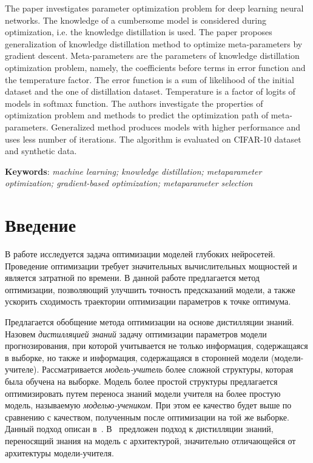 \documentclass[12pt, twoside]{article}
\begin{document}
\abstractEng
{The paper investigates parameter optimization problem for deep learning neural networks. The knowledge of a cumbersome model is considered during optimization, i.e. the knowledge distillation is used. The paper proposes generalization of knowledge distillation method to optimize meta-parameters by gradient descent. Meta-parameters are the parameters of knowledge distillation optimization problem, namely, the coefficients before terms in error function and the temperature factor. The error function is a sum of likelihood of the initial dataset and the one of distillation dataset. Temperature is a factor of logits of models in softmax function. The authors investigate the properties of optimization problem and methods to predict the optimization path of meta-parameters. Generalized method produces models with higher performance and uses less number of iterations. The algorithm is evaluated on CIFAR-10 dataset and synthetic data.


\noindent
\textbf{Keywords}: \emph{machine learning; knowledge distillation; metaparameter optimization; gradient-based optimization; metaparameter selection}}

\doi{}
\receivedRus{}
\receivedEng{}

\maketitle
\linenumbers

\section{Введение}
В работе исследуется задача оптимизации моделей глубоких нейросетей. Проведение оптимизации требует значительных вычислительных мощностей и является затратной по времени. В данной работе предлагается метод оптимизации, позволяющий улучшить точность предсказаний модели, а также ускорить сходимость траектории оптимизации параметров к точке оптимума.

Предлагается обобщение метода оптимизации на основе дистилляции знаний. Назовем \textit{дистилляцией знаний} задачу оптимизации параметров модели прогнозирования, при которой учитывается не только информация, содержащаяся в выборке, но также и информация, содержащаяся в сторонней модели (модели-учителе). Рассматривается \textit{модель-учитель} более сложной структуры, которая была обучена на выборке. Модель более простой структуры предлагается оптимизировать путем переноса знаний модели учителя на более простую модель, называемую \textit{моделью-учеником}. При этом ее качество будет выше по сравнению с качеством, полученным после оптимизации на той же выборке. Данный подход описан в~\cite{journals/corr/HintonVD15}. В~\cite{conf/cvpr/PassalisTT20} предложен подход к дистилляции знаний, переносящий знания на модель с архитектурой, значительно отличающейся от архитектуры модели-учителя.
\end{document}
